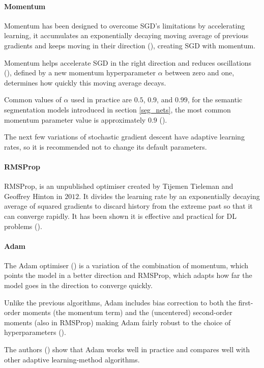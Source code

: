 \paragraph{Momentum}
Momentum has been designed to overcome \gls{SGD}'s limitations by accelerating learning, it accumulates an exponentially decaying moving average of previous gradients and keeps moving in their direction (\cite{GoodBengCour16}), creating \gls{SGD} with momentum. 

Momentum helps accelerate \gls{SGD} in the right direction and reduces oscillations (\cite{ruder2017overview}), defined by a new momentum hyperparameter $\alpha$ between zero and one, determines how quickly this moving average decays.

Common values of $\alpha$ used in practice are $0.5$, $0.9$, and $0.99$, for the semantic segmentation models introduced in section \ref{seg_nets}, the most common momentum parameter value is approximately $0.9$ (\cite{sultana2020106062}).

The next few variations of stochastic gradient descent have adaptive learning rates, so it is recommended not to change its default parameters.

\paragraph{\gls{RMSProp}}
\gls{RMSProp}, is an unpublished optimiser created by Tijemen Tieleman and Geoffrey Hinton in $2012$. It divides the learning rate by an exponentially decaying average of squared gradients to discard history from the extreme past so that it can converge rapidly. It has been shown it is effective and practical for \gls{DL} problems (\cite{GoodBengCour16}).

\paragraph{\gls{Adam}}
The \gls{Adam} optimiser (\cite{kingma2017adam}) is a variation of the combination of momentum, which points the model in a better direction and \gls{RMSProp}, which adapts how far the model goes in the direction to converge quickly.

Unlike the previous algorithms, \gls{Adam} includes bias correction to both the ﬁrst-order moments (the momentum term) and the (uncentered) second-order moments (also in \gls{RMSProp}) making \gls{Adam} fairly robust to the choice of hyperparameters (\cite{GoodBengCour16}).

The authors (\cite{kingma2017adam}) show that \gls{Adam} works well in practice and compares well with other adaptive learning-method algorithms.
